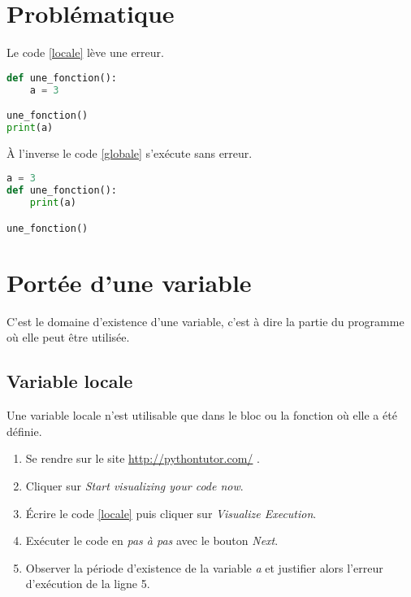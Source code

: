 \documentclass[a4paper,11pt]{article}
\begin{document}
\begin{Form}
\section{Problématique}
Le code \ref{locale} lève une erreur.
\begin{center}
\begin{lstlisting}[language=Python]
def une_fonction():
	a = 3

une_fonction()
print(a)
\end{lstlisting}
\label{locale}
\end{center}
À l'inverse le code \ref{globale} s'exécute sans erreur.
\begin{center}
\begin{lstlisting}[language=Python]
a = 3
def une_fonction():
    print(a)

une_fonction()
\end{lstlisting}
\label{globale}
\end{center}
\begin{center}
\end{center}
\section{Portée d'une variable}
C'est le domaine d'existence d'une variable, c'est à dire la partie du programme où elle peut être utilisée.
\subsection{Variable locale}
\begin{aretenir}[]
Une variable locale n'est utilisable que dans le bloc ou la fonction où elle a été définie.
\end{aretenir}
\begin{activite}
\begin{enumerate}
\item Se rendre sur le site \url{http://pythontutor.com/} .
\item Cliquer sur \emph{Start visualizing your code now}.
\item Écrire le code \ref{locale} puis cliquer sur \emph{Visualize Execution}.
\item Exécuter le code en \emph{pas à pas} avec le bouton \emph{Next}.
\item Observer la période d'existence de la variable \emph{a} et justifier alors l'erreur d'exécution de la ligne 5.
\end{enumerate}
\end{activite}

\end{Form}
\end{document}

